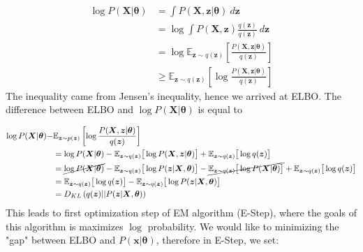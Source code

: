 \begin{equation}
    \begin{aligned}
         \log P(\boldsymbol{X} | \boldsymbol{\theta}) &= \int P(\boldsymbol{X}, \boldsymbol{z} | \boldsymbol{\theta}) \ d\boldsymbol{z} \\
         &= \log \int P(\boldsymbol{X}, \boldsymbol{z}) \frac{q(\boldsymbol{z})}{q(\boldsymbol{z})} \ d \boldsymbol{z} \\
         &= \log \mathbb{E}_{\boldsymbol{z} \sim q(\boldsymbol{z})} \left[ \frac{P(\boldsymbol{X}, \boldsymbol{z} | \boldsymbol{\theta})}{q(\boldsymbol{z})} \right] \\
         &\ge \mathbb{E}_{\boldsymbol{z} \sim q(\boldsymbol{z})} \left[ \log\frac{P(\boldsymbol{X}, \boldsymbol{z} | \boldsymbol{\theta})}{q(\boldsymbol{z})} \right]
    \end{aligned}
\end{equation}
The inequality came from Jensen's inequality, hence we arrived at ELBO. The difference between ELBO and $\log P(\boldsymbol{X} |\boldsymbol{\theta})$ is equal to 

\begin{equation}
    \begin{aligned}
        \log P(\boldsymbol{X} |\boldsymbol{\theta}) - &\mathbb{E}_{\boldsymbol{z} \sim p(\boldsymbol{z})} \left[ \log\frac{P(\boldsymbol{X}, \boldsymbol{z} | \boldsymbol{\theta})}{q(\boldsymbol{z})} \right] \\
        &= \log P(\boldsymbol{X} |\boldsymbol{\theta}) - \mathbb{E}_{\boldsymbol{z} \sim q(\boldsymbol{z})}\big[ \log P(\boldsymbol{X}, \boldsymbol{z} | \boldsymbol{\theta}) \big] + \mathbb{E}_{\boldsymbol{z} \sim q(\boldsymbol{z})} \big[ \log q(\boldsymbol{z}) \big]  \\ 
        &= \cancel{\log P(\boldsymbol{X} |\boldsymbol{\theta})} - \mathbb{E}_{\boldsymbol{z} \sim q(\boldsymbol{z})}\big[ \log P( \boldsymbol{z} |\boldsymbol{X} , \boldsymbol{\theta}) \big] - \cancel{\mathbb{E}_{\boldsymbol{z} \sim q(\boldsymbol{z})}\big[ \log P( \boldsymbol{X} | \boldsymbol{\theta}) \big]} + \mathbb{E}_{\boldsymbol{z} \sim q(\boldsymbol{z})} \big[ \log q(\boldsymbol{z}) \big] \\ 
        &=  \mathbb{E}_{\boldsymbol{z} \sim q(\boldsymbol{z})} \big[ \log q(\boldsymbol{z}) \big] - \mathbb{E}_{\boldsymbol{z} \sim q(\boldsymbol{z})} \big[ \log P( \boldsymbol{z} |\boldsymbol{X} , \boldsymbol{\theta}) \big] \\
        &= D_{KL} \left( q(\boldsymbol{z}) || P( \boldsymbol{z} |\boldsymbol{X} , \boldsymbol{\theta}) \right)
    \end{aligned}
\end{equation}
This leads to first optimization step of EM algorithm (E-Step), where the goals of this algorithm is maximizes $\log$ probability. We would like to minimizing the "gap" between ELBO and $P(\boldsymbol{x} | \boldsymbol{\theta})$, therefore in E-Step, we set: 

